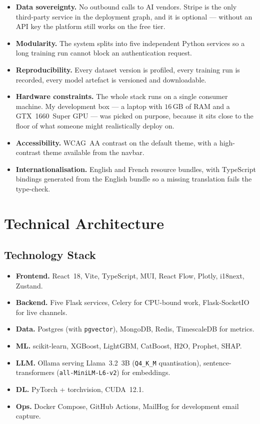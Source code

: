 \documentclass[12pt, a4paper]{report}
\begin{document}
\begin{itemize}
    \item \textbf{Data sovereignty.} No outbound calls to AI vendors.
        Stripe is the only third-party service in the deployment
        graph, and it is optional --- without an API key the platform
        still works on the free tier.
    \item \textbf{Modularity.} The system splits into five
        independent Python services so a long training run cannot
        block an authentication request.
    \item \textbf{Reproducibility.} Every dataset version is profiled,
        every training run is recorded, every model artefact is
        versioned and downloadable.
    \item \textbf{Hardware constraints.} The whole stack runs on a
        single consumer machine. My development box --- a laptop with
        $16$\,GB of RAM and a GTX~1660~Super GPU --- was picked on
        purpose, because it sits close to the floor of what someone
        might realistically deploy on.
    \item \textbf{Accessibility.} WCAG~AA contrast on the default
        theme, with a high-contrast theme available from the navbar.
    \item \textbf{Internationalisation.} English and French resource
        bundles, with TypeScript bindings generated from the English
        bundle so a missing translation fails the type-check.
\end{itemize}

\section{Technical Architecture}

\subsection{Technology Stack}

\begin{itemize}
    \item \textbf{Frontend.} React~18, Vite, TypeScript, MUI, React
        Flow, Plotly, i18next, Zustand.
    \item \textbf{Backend.} Five Flask services, Celery for
        CPU-bound work, Flask-SocketIO for live channels.
    \item \textbf{Data.} Postgres (with \texttt{pgvector}), MongoDB,
        Redis, TimescaleDB for metrics.
    \item \textbf{ML.} scikit-learn, XGBoost, LightGBM, CatBoost, H2O,
        Prophet, SHAP.
    \item \textbf{LLM.} Ollama serving Llama~3.2~3B
        (\texttt{Q4\_K\_M} quantisation), sentence-transformers
        (\texttt{all-MiniLM-L6-v2}) for embeddings.
    \item \textbf{DL.} PyTorch + torchvision, CUDA~12.1.
    \item \textbf{Ops.} Docker Compose, GitHub Actions, MailHog for
        development email capture.
\end{itemize}
\end{document}
